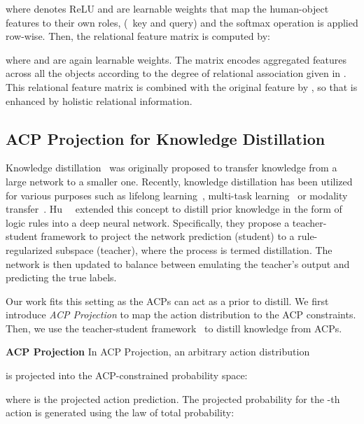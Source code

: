 where { denotes ReLU and}  are learnable {weights} that map the human-object features  to their own roles, (\eg~key and query) and 
the softmax operation is applied row-wise.
Then, the relational feature matrix is computed by:

where  and  are again learnable {weights}.
The matrix  encodes aggregated features across all the objects according to the degree of relational association given in . This relational feature matrix is combined with the original feature  by , so that  is enhanced by holistic relational information.








\subsection{{ACP Projection for Knowledge Distillation}}
\label{sec.knowledge_distillation}

Knowledge distillation~\cite{hinton2015distilling} was originally proposed to transfer knowledge from a large network to a smaller one. 
Recently, knowledge distillation has been utilized for various purposes such as lifelong learning~\cite{li2016learning}, multi-task learning~\cite{kim2018disjoint} or modality transfer~\cite{cho2021dealing,hoffman2016learning}.
Hu~\etal~\cite{hu2016harnessing} extended this concept to distill prior knowledge in the form of logic rules into a deep neural network. Specifically, they propose a teacher-student framework to project the network prediction (student) to a rule-regularized subspace (teacher), where the process is termed distillation. 
The network is then updated to balance between emulating the teacher's output and predicting the true labels.


Our work fits this setting as
the ACPs can act as a prior to distill. 
We first introduce \emph{ACP Projection} to map the action distribution to the ACP constraints. Then, we use the teacher-student framework~\cite{hu2016harnessing} to distill knowledge from ACPs.

\noindent\textbf{ACP Projection} In ACP Projection, an arbitrary action distribution 

is projected into the ACP-constrained probability space:

where  is the projected action prediction. The projected probability for the -th action  is generated using the law of total probability:



